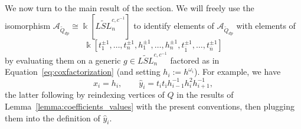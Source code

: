 \documentclass[12pt]{amsart}
\newcommand{\cA}{\mathcal{A}}
\newcommand{\kk}{\Bbbk}
\newcommand{\ol}[1]{\overline{#1}}
\newcommand{\Qdp}{\widetilde{Q}_{dp}}
\theoremstyle{remark}
\numberwithin{equation}{section}
\numberwithin{figure}{section}
\begin{document}
We now turn to the main result of the section.
We will freely use the isomorphism $\cA_{\Qdp} \cong \kk[\widetilde{LSL}_n^{c,c^{-1}}]$ to identify elements of $\cA_{\Qdp}$ with elements of
\[
  \kk[t_{1}^{\pm1},\dotsc,t_{n}^{\pm 1},h_1^{\pm 1},\dotsc,h_{n}^{\pm 1},t_{\ol{1}}^{\pm 1},\dotsc,t_{\ol{n}}^{\pm 1}]
\]
by evaluating them on a generic $g \in \widetilde{LSL}_n^{c,c^{-1}}$ factored as in Equation~\eqref{eq:coxfactorization} (and setting $h_i := h^{\omega_i}$).
For example, we have
\begin{equation}
  \label{eq:typeAyhat}
  x_i = h_i,\quad\quad \hat{y}_i = t_it_{\ol{\imath}}h_{i-1}^{-1}h_i^2h_{i+1}^{-1},
\end{equation}
the latter following by reindexing vertices of $Q$ in the results of Lemma~\ref{lemma:coefficients_values} with the present conventions, then plugging them into the definition of $\hat{y}_i$.
\end{document}
